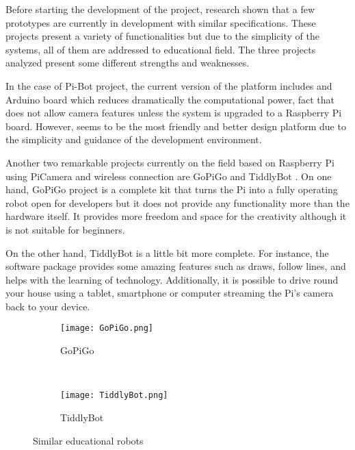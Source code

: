 Before starting the development of the project, research shown that a few prototypes are currently in development with similar specifications. These projects present a variety of functionalities but due to the simplicity of the systems, all of them are addressed to educational field. The three projects analyzed present some different strengths and weaknesses. 

In the case of Pi-Bot \cite{PiBot} project, the current version of the platform includes and Arduino board which reduces dramatically the computational power, fact that does not allow camera features unless the system is upgraded to a Raspberry Pi board. However, seems to be the most friendly and better design platform due to the simplicity and guidance of the development environment.

Another two remarkable projects currently on the field based on Raspberry Pi using PiCamera and wireless connection are GoPiGo \cite{GoPiGo} and TiddlyBot \cite{TiddlyBot}. On one hand, GoPiGo project is a complete kit that turns the Pi into a fully operating robot open for developers but it does not provide any functionality more than the hardware itself. It provides more freedom and space for the creativity although it is not suitable for beginners.

On the other hand, TiddlyBot is a little bit more complete. For instance, the software package provides some amazing features such as draws, follow lines, and helps with the learning of technology. Additionally, it is possible to drive round your house using a tablet, smartphone or computer streaming the Pi's camera back to your device.

\begin{figure}
     \centering
     \begin{subfigure}[b]{0.3\textwidth}
             \texttt{[image: GoPiGo.png]}
             \caption{GoPiGo}
             \label{fig:GoPiGo}
     \end{subfigure}%
     ~
     \begin{subfigure}[b]{0.3\textwidth}
             \texttt{[image: TiddlyBot.png]}
             \caption{TiddlyBot}
             \label{fig:TiddlyBot}
     \end{subfigure}
     \caption{Similar educational robots}\label{fig:robots}
\end{figure}